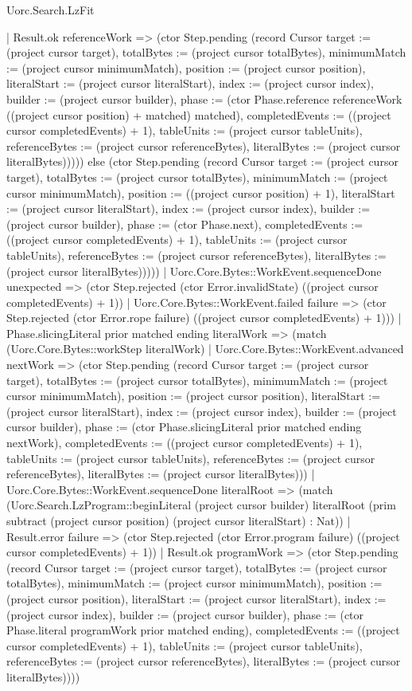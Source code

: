 \begin{lexlean}{Uorc.Search.LzFit}
\begin{semanticmodule}
{        | Result.ok referenceWork => (ctor Step.pending (record Cursor {target := (project cursor target), totalBytes := (project cursor totalBytes), minimumMatch := (project cursor minimumMatch), position := (project cursor position), literalStart := (project cursor literalStart), index := (project cursor index), builder := (project cursor builder), phase := (ctor Phase.reference referenceWork ((project cursor position) + matched) matched), completedEvents := ((project cursor completedEvents) + 1), tableUnits := (project cursor tableUnits), referenceBytes := (project cursor referenceBytes), literalBytes := (project cursor literalBytes)})))) else (ctor Step.pending (record Cursor {target := (project cursor target), totalBytes := (project cursor totalBytes), minimumMatch := (project cursor minimumMatch), position := ((project cursor position) + 1), literalStart := (project cursor literalStart), index := (project cursor index), builder := (project cursor builder), phase := (ctor Phase.next), completedEvents := ((project cursor completedEvents) + 1), tableUnits := (project cursor tableUnits), referenceBytes := (project cursor referenceBytes), literalBytes := (project cursor literalBytes)}))))
      | Uorc.Core.Bytes::WorkEvent.sequenceDone unexpected => (ctor Step.rejected (ctor Error.invalidState) ((project cursor completedEvents) + 1))
      | Uorc.Core.Bytes::WorkEvent.failed failure => (ctor Step.rejected (ctor Error.rope failure) ((project cursor completedEvents) + 1)))
    | Phase.slicingLiteral prior matched ending literalWork => (match (Uorc.Core.Bytes::workStep literalWork)
      | Uorc.Core.Bytes::WorkEvent.advanced nextWork => (ctor Step.pending (record Cursor {target := (project cursor target), totalBytes := (project cursor totalBytes), minimumMatch := (project cursor minimumMatch), position := (project cursor position), literalStart := (project cursor literalStart), index := (project cursor index), builder := (project cursor builder), phase := (ctor Phase.slicingLiteral prior matched ending nextWork), completedEvents := ((project cursor completedEvents) + 1), tableUnits := (project cursor tableUnits), referenceBytes := (project cursor referenceBytes), literalBytes := (project cursor literalBytes)}))
      | Uorc.Core.Bytes::WorkEvent.sequenceDone literalRoot => (match (Uorc.Search.LzProgram::beginLiteral (project cursor builder) literalRoot (prim subtract (project cursor position) (project cursor literalStart) : Nat))
        | Result.error failure => (ctor Step.rejected (ctor Error.program failure) ((project cursor completedEvents) + 1))
        | Result.ok programWork => (ctor Step.pending (record Cursor {target := (project cursor target), totalBytes := (project cursor totalBytes), minimumMatch := (project cursor minimumMatch), position := (project cursor position), literalStart := (project cursor literalStart), index := (project cursor index), builder := (project cursor builder), phase := (ctor Phase.literal programWork prior matched ending), completedEvents := ((project cursor completedEvents) + 1), tableUnits := (project cursor tableUnits), referenceBytes := (project cursor referenceBytes), literalBytes := (project cursor literalBytes)})))
}
\end{semanticmodule}
\end{lexlean}
